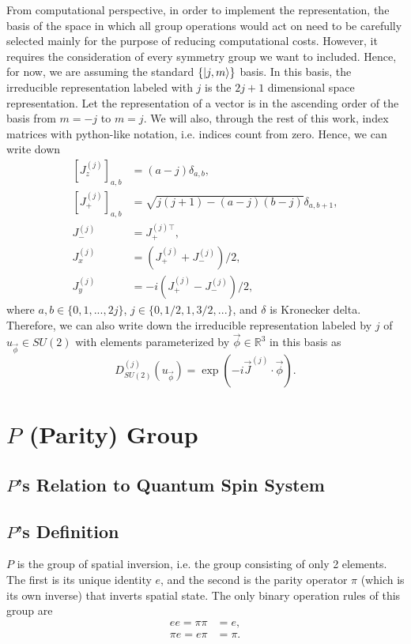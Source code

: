 \documentclass[preprint, 12pt]{revtex4-2}
\numberwithin{equation}{section}
\begin{document}
From computational perspective, in order to implement the representation, the basis of the space in which all group operations would act on need to be carefully selected mainly for the purpose of reducing computational costs. However, it requires the consideration of every symmetry group we want to included. Hence, for now, we are assuming the standard $\{\ket{j, m}\}$ basis. In this basis, the irreducible representation labeled with $j$ is the $2j+1$ dimensional space representation. Let the representation of a vector is in the ascending order of the basis from $m = -j$ to $m = j$. We will also, through the rest of this work, index matrices with python-like notation, i.e. indices count from zero. Hence, we can write down
\begin{equation}\label{eq:J's standard basis}
    \begin{aligned}
        \left[J_z^{(j)}\right]_{a,b} &= (a-j)\delta_{a, b}, \\
        \left[J_+^{(j)}\right]_{a,b} &= \sqrt{j(j+1)-(a-j)(b-j)}\delta_{a,b+1}, \\
        J_-^{(j)} &= J_+^{(j)\top}, \\
        J_x^{(j)} &= \left(J_+^{(j)}+J_-^{(j)}\right)/2, \\
        J_y^{(j)} &= -i\left(J_+^{(j)}-J_-^{(j)}\right)/2,
    \end{aligned}
\end{equation}
where $a, b\in \{0, 1, ..., 2j\}$, $j\in \{0, 1/2, 1, 3/2, ...\}$, and $\delta$ is Kronecker delta. Therefore, we can also write down the irreducible representation labeled by $j$ of $u_{\vec{\phi}}\in SU(2)$ with elements parameterized by $\vec{\phi}\in\mathbb{R}^3$ in this basis as
\begin{equation}\label{eq:SU2 Irreps}
    D^{(j)}_{SU(2)}(u_{\vec{\phi}}) = \exp(-i\vec{J}^{(j)}\cdot\vec{\phi}).
\end{equation}

\newpage
\section{$P$ (Parity) Group}

\subsection{$P$'s Relation to Quantum Spin System}

\subsection{$P$'s Definition}
$P$ is the group of spatial inversion, i.e. the group consisting of only 2 elements. The first is its unique identity $e$, and the second is the parity operator $\pi$ (which is its own inverse) that inverts spatial state. The only binary operation rules of this group are
\begin{equation}\label{eq:P binary operations}
    \begin{aligned}
        ee = \pi\pi &= e, \\
        \pi e = e \pi &= \pi.
    \end{aligned}
\end{equation}
\end{document}

